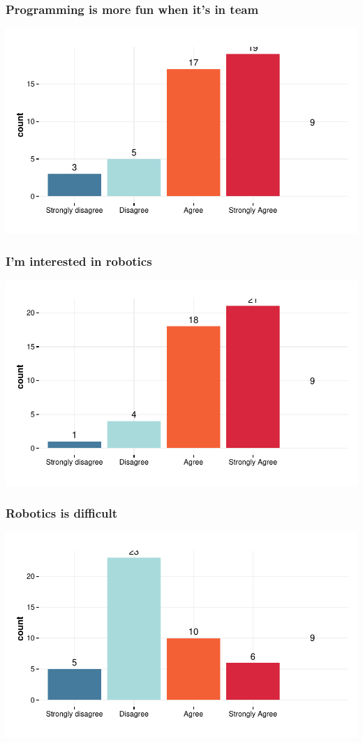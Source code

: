 \documentclass{article}
\begin{document}
\subsubsection{Programming is more fun when it’s in team}
\includegraphics{Raw_num/plots/-plot_prog_fun_team}

\subsubsection{I’m interested in robotics}
\includegraphics{Raw_num/plots/-plot_robotik_interet}


\subsubsection{Robotics is difficult}
\includegraphics{Raw_num/plots/-plot_hard_robotik}
\end{document}
